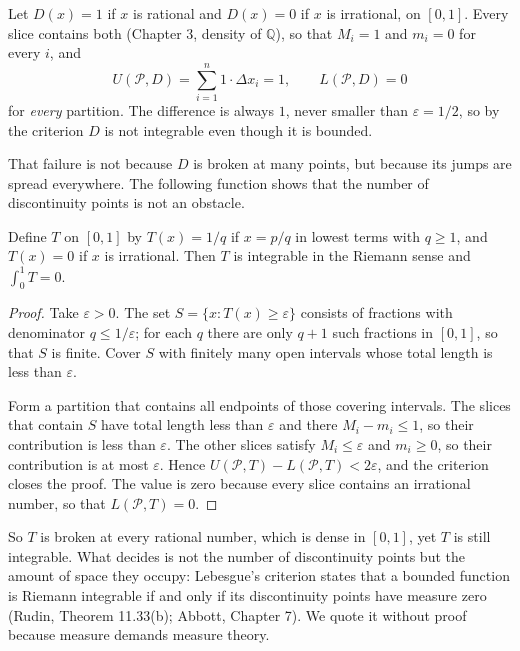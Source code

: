 \begin{contoh}
Let $D(x)=1$ if $x$ is rational and $D(x)=0$ if $x$ is irrational, on $[0,1]$.
Every slice contains both (Chapter 3, density of $\mathbb{Q}$), so that $M_i=1$ and
$m_i=0$ for every $i$, and
\[
U(\mathcal{P},D)=\sum_{i=1}^{n}1\cdot\Delta x_i=1,
\qquad
L(\mathcal{P},D)=0
\]
for \emph{every} partition. The difference is always $1$, never smaller than
$\varepsilon=1/2$, so by the criterion $D$ is not integrable even though it is bounded.
\end{contoh}

That failure is not because $D$ is broken at many points, but because
its jumps are spread everywhere. The following function shows that the number of
discontinuity points is not an obstacle.

\begin{teorema}
Define $T$ on $[0,1]$ by $T(x)=1/q$ if $x=p/q$ in lowest
terms with $q\ge1$, and $T(x)=0$ if $x$ is irrational. Then $T$ is integrable in the
Riemann sense and $\int_0^1 T=0$.
\end{teorema}

\begin{proof}
Take $\varepsilon>0$. The set $S=\{x:T(x)\ge\varepsilon\}$ consists of fractions with
denominator $q\le1/\varepsilon$; for each $q$ there are only $q+1$ such fractions in
$[0,1]$, so that $S$ is finite. Cover $S$ with finitely many open intervals
whose total length is less than $\varepsilon$.

Form a partition that contains all endpoints of those covering intervals. The slices that contain $S$
have total length less than $\varepsilon$ and there $M_i-m_i\le1$, so
their contribution is less than $\varepsilon$. The other slices satisfy $M_i\le\varepsilon$ and
$m_i\ge0$, so their contribution is at most $\varepsilon$. Hence
$U(\mathcal{P},T)-L(\mathcal{P},T)<2\varepsilon$, and the criterion closes the proof. The value is
zero because every slice contains an irrational number, so that $L(\mathcal{P},T)=0$.
\end{proof}

So $T$ is broken at every rational number, which is dense in $[0,1]$, yet $T$ is still
integrable. What decides is not the number of discontinuity points but the amount of space
they occupy: Lebesgue's criterion states that a bounded function is Riemann integrable
if and only if its discontinuity points have measure zero (Rudin, Theorem 11.33(b); Abbott,
Chapter 7). We quote it without proof because measure demands measure theory.

